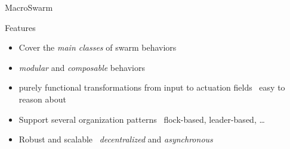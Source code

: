 \documentclass[presentation, 9pt]{beamer}\mode<presentation>{\usetheme{AMSBolognaFC}}
\begin{document}
\begin{frame}{MacroSwarm}
\begin{alertblock}{Features}
	\begin{itemize}
		\item Cover the \emph{main classes} of swarm behaviors
		\item \emph{modular} and \emph{composable} behaviors
		\item purely functional transformations from input to actuation fields \faArrowRight \, easy to reason about
		\item Support several organization patterns \faArrowRight \, flock-based, leader-based, \dots
		\item Robust and scalable \faArrowRight \, \emph{decentralized} and \emph{asynchronous}
	\end{itemize}
\end{alertblock}
\end{frame}
\end{document}
